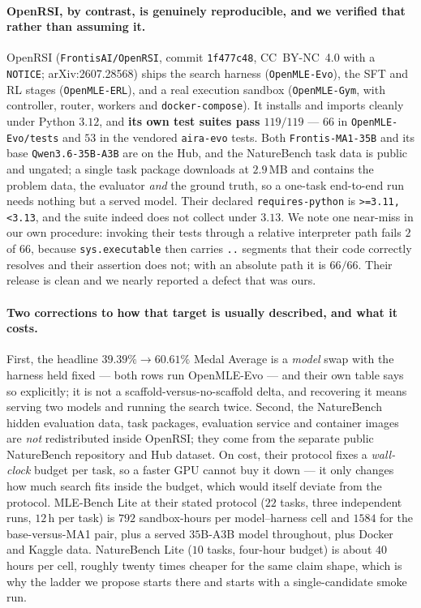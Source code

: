 \paragraph{OpenRSI, by contrast, is genuinely reproducible, and we verified that rather
than assuming it.} OpenRSI (\texttt{FrontisAI/OpenRSI}, commit \texttt{1f477c48},
CC~BY-NC~4.0 with a \texttt{NOTICE}; arXiv:2607.28568) ships the search harness
(\texttt{OpenMLE-Evo}), the SFT and RL stages (\texttt{OpenMLE-ERL}), and a real execution
sandbox (\texttt{OpenMLE-Gym}, with controller, router, workers and
\texttt{docker-compose}). It installs and imports cleanly under Python $3.12$, and
\textbf{its own test suites pass $119/119$} --- $66$ in \texttt{OpenMLE-Evo/tests} and
$53$ in the vendored \texttt{aira-evo} tests. Both \texttt{Frontis-MA1-35B} and its base
\texttt{Qwen3.6-35B-A3B} are on the Hub, and the NatureBench task data is public and
ungated; a single task package downloads at $2.9$\,MB and contains the problem data, the
evaluator \emph{and} the ground truth, so a one-task end-to-end run needs nothing but a
served model. Their declared \texttt{requires-python} is \texttt{>=3.11,<3.13}, and the
suite indeed does not collect under $3.13$. We note one near-miss in our own procedure:
invoking their tests through a relative interpreter path fails $2$ of $66$, because
\texttt{sys.executable} then carries \texttt{..} segments that their code correctly
resolves and their assertion does not; with an absolute path it is $66/66$. Their release
is clean and we nearly reported a defect that was ours.

\paragraph{Two corrections to how that target is usually described, and what it costs.}
First, the headline $39.39\% \rightarrow 60.61\%$ Medal Average is a \emph{model} swap
with the harness held fixed --- both rows run OpenMLE-Evo --- and their own table says so
explicitly; it is not a scaffold-versus-no-scaffold delta, and recovering it means serving
two models and running the search twice. Second, the NatureBench hidden evaluation data,
task packages, evaluation service and container images are \emph{not} redistributed inside
OpenRSI; they come from the separate public NatureBench repository and Hub dataset. On
cost, their protocol fixes a \emph{wall-clock} budget per task, so a faster GPU cannot buy
it down --- it only changes how much search fits inside the budget, which would itself
deviate from the protocol. MLE-Bench Lite at their stated protocol ($22$ tasks, three
independent runs, $12$\,h per task) is $792$ sandbox-hours per model--harness cell and
$1584$ for the base-versus-MA1 pair, plus a served $35$B-A3B model throughout, plus Docker
and Kaggle data. NatureBench Lite ($10$ tasks, four-hour budget) is about $40$ hours per
cell, roughly twenty times cheaper for the same claim shape, which is why the ladder we
propose starts there and starts with a single-candidate smoke run.

